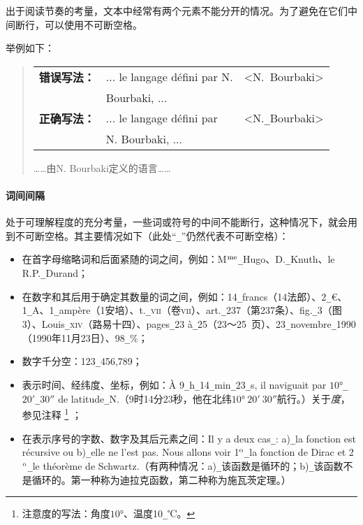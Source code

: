 出于阅读节奏的考量，文本中经常有两个元素不能分开的情况。为了避免在它们中间断行，可以使用不可断空格。

举例如下：

\begin{quote}
    \begin{tabular}{lll}
        \textbf{错误写法：} & ... le langage défini par N. & <N.\verb*+ +Bourbaki> \\
        & Bourbaki, ... & \\
        \textbf{正确写法：} & ... le langage défini par & <N.\verb|_|Bourbaki>\\
        & N. Bourbaki, ... & \\
    \end{tabular}

    \begin{bil}
        ……由N. Bourbaki定义的语言……
    \end{bil}
\end{quote}

\paragraph*{词间间隔} 处于可理解程度的充分考量，一些词或符号的中间不能断行，这种情况下，就会用到不可断空格。其主要情况如下（此处“\verb|_|”仍然代表不可断空格）：

\begin{itemize}
    \item 在首字母缩略词和后面紧随的词之间，例如：M$^{\rm me}$\verb|_|Hugo、D.\verb|_|Knuth、le R.P.\verb|_|Durand；
    \item 在数字和其后用于确定其数量的词之间，例如：14\verb|_|francs（14法郎）、2\verb|_|€、1\verb|_|A、1\verb|_|ampère（1安培）、t.\verb|_|\textsc{vii}（卷\textsc{vii}）、art.\verb|_|237（第237条）、fig.\verb|_|3（图3）、Louis\verb|_|\textsc{xiv}（路易十四）、pages\verb|_|23 à\verb|_|25（23～25~页）、23\verb|_|novembre\verb|_|1990（1990年11月23日）、98\verb|_|\%；
    \item 数字千分空：123\verb|_|456,789；
    \item 表示时间、经纬度、坐标，例如：À 9\verb|_|h\verb|_|14\verb|_|min\verb|_|23\verb|_|s, il naviguait par $10°$\verb|_|$20'$\verb|_|$30''$ de latitude\verb|_|N.（9时14分23秒，他在北纬$10°\ 20'\ 30''$航行。）关于\emph{度}，参见注释
        \footnote{注意度的写法：角度$10°$、温度10\texttt{\_}℃。}
    ；
    \item 在表示序号的字数、数字及其后元素之间：Il y a deux cas\verb|_|: a)\verb|_|la fonction est récursive ou b)\verb|_|elle ne l’est pas. Nous allons voir 1$^{\rm o}$\verb|_|la fonction de Dirac et 2$^{\rm o}$\verb|_|le théorème de Schwartz.（有两种情况：a)\verb|_|该函数是循环的；b)\verb|_|该函数不是循环的。第一种称为迪拉克函数，第二种称为施瓦茨定理。）
\end{itemize}

